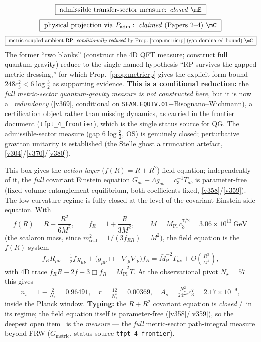 \documentclass[11pt,a4paper]{article}
\newcommand{\Mbar}{\bar M_{\mathrm{Pl}}}
\newcommand{\cthree}{c_3}
\theoremstyle{definition}
\begin{document}
\begin{gapbox}
\[
  \boxed{\ \text{admissible transfer-sector measure: \emph{closed} \mE}\ }
\]
\[
  \boxed{\ \text{physical projection via }P_{\mathrm{adm}}:\ \text{\emph{claimed} (Papers 2--4) \mC}\ }
\]
\[
  \boxed{\ \text{metric-coupled ambient RP: \emph{conditionally reduced} by Prop.~\ref{prop:metricrp} (gap-dominated bound) \mC}\ }
\]
The former ``two blanks'' (construct the 4D QFT measure; construct full quantum gravity) reduce to the
single named hypothesis ``RP survives the gapped metric dressing,'' for which Prop.~\ref{prop:metricrp}
gives the explicit form bound $248\cthree^2<6\log\tfrac32$ as supporting evidence. \textbf{This is a
conditional reduction:} the \emph{full metric-sector quantum-gravity measure is not constructed here}, but it is
now a \mC\ \emph{redundancy} (\vref{v369}, conditional on \texttt{SEAM.EQUIV.01}${+}$Bisognano--Wichmann), a
certification object rather than missing dynamics, as carried in the frontier document
(\texttt{tfpt\_4\_frontier}), which is the single status source for QG. The admissible-sector measure
(gap $6\log\tfrac32$, OS) is genuinely closed; perturbative graviton unitarity is established (the Stelle ghost a
truncation artefact, \vref{v304}/\vref{v370}/\vref{v380}).\end{gapbox}

\begin{keybox}
This box gives the \emph{action-layer} ($f(R)=R+R^2$) field equation; independently of it, the \emph{full}
covariant Einstein equation $G_{ab}{+}\Lambda g_{ab}=\cthree^{-1}T_{ab}$ is parameter-free (fixed-volume
entanglement equilibrium, both coefficients fixed, \vref{v358}/\vref{v359}). The low-curvature regime is
fully closed at the level of the covariant Einstein-side equation. With
\[
  f(R)=R+\frac{R^2}{6M^2},\qquad f_R=1+\frac{R}{3M^2},\qquad
  \boxed{\,M=\Mbar\,\cthree^{7/2}=3.06\times10^{13}\ \mathrm{GeV}\,}
\]
(the scalaron mass, since $m_{\mathrm{scal}}^2=1/(3f_{RR})=M^2$), the field equation is the $f(R)$ system
\[
  f_R R_{\mu\nu}-\tfrac12 f\,g_{\mu\nu}+\bigl(g_{\mu\nu}\Box-\nabla_\mu\nabla_\nu\bigr)f_R
  =\Mbar^{-2}T_{\mu\nu}+O\!\left(\tfrac{R^3}{M^4}\right),
\]
with $4$D trace $f_R R-2f+3\Box f_R=\Mbar^{-2}T$. At the observational pivot $N_\star=57$ this gives
\[
  n_s=1-\tfrac2{N_\star}=0.96491,\quad r=\tfrac{12}{N_\star^2}=0.00369,\quad
  A_s=\tfrac{N_\star^2}{24\pi^2}\cthree^7=2.17\times10^{-9},
\]
inside the Planck window. \textbf{Typing:} the $R+R^2$ covariant equation is \emph{closed} \mE/\mC\ in its
regime; the field equation itself is parameter-free (\vref{v358}/\vref{v359}), so the deepest open item \mO\
is the \emph{measure} --- the \emph{full} metric-sector path-integral measure beyond FRW
($G_{\mathrm{metric}}$, status source \texttt{tfpt\_4\_frontier}). 
\end{keybox}
\end{document}
